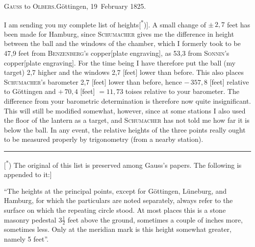 \begin{center}
\textsc{Gauss} to \textsc{Olbers}.\quad Göttingen, 19~February 1825.
\end{center}

\par\noindent\hspace*{\parindent}I am sending you my complete list of heights[\textsuperscript{*})].
A small change of \(\pm\,2{,}7\) feet has been made for Hamburg, since \textsc{Schumacher}
gives me the difference in height between the ball and the windows of the
chamber, which I formerly took to be 47,9 feet from \textsc{Benzenberg}'s
copper[plate engraving], as 53,3 from \textsc{Sonnin}'s copper[plate engraving].
For the time being I have therefore put the ball (my target) 2,7 higher
and the windows 2,7 [feet] lower than before.
This also places \textsc{Schumacher}'s barometer 2,7 [feet] lower than
before, hence \(-\,357{,}8\) [feet] relative to Göttingen and \(+\,70{,}4\)
[feet] \(= 11{,}73\) toises relative to your barometer.
The difference from your barometric determination is therefore now quite insignificant.
This will still be modified somewhat, however, since at some stations I also used the
floor of the lantern as a target, and \textsc{Schumacher} has not told me how far
it is below the ball. In any event, the relative heights of the three points
really ought to be measured properly by trigonometry (from a nearby station).

\par\smallskip\noindent\rule{.24\linewidth}{.4pt}\par\smallskip
{\footnotesize
\noindent\hspace*{2.75em}[\textsuperscript{*}) The original of this list is preserved among Gauss’s papers. The following is appended to it:]\par
\noindent\hspace*{2.75em}“The heights at the principal points, except for Göttingen, Lüneburg, and Hamburg,
for which the particulars are noted separately, always refer to the surface on which the repeating circle stood.
At most places this is a stone masonry pedestal 3\(\tfrac{1}{2}\) feet above the ground,
sometimes a couple of inches more, sometimes less.
Only at the meridian mark is this height somewhat greater, namely 5 feet”.\par
}

